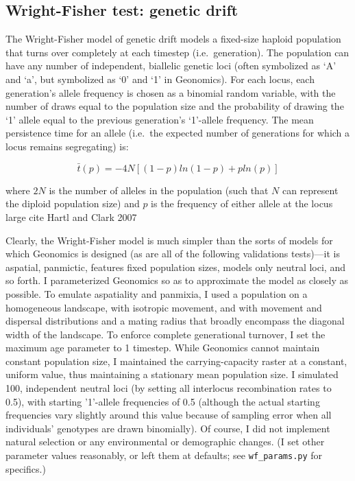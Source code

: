 ﻿\documentclass{article}
\begin{document}
\subsection{Wright-Fisher test: genetic drift}
The Wright-Fisher model of genetic drift models a fixed-size haploid population that
turns over completely at each timestep (i.e.\ generation). The population can have
any number of independent, biallelic genetic loci (often symbolized as ‘A’ and ‘a’,
but symbolized as ‘0’ and ‘1’ in Geonomics). For each locus, each generation’s allele
frequency is chosen as a binomial random variable, with the number of draws equal to
the population size and the probability of drawing the ‘1’ allele equal to the previous 
generation’s ‘1’-allele frequency. The mean persistence time for an allele 
(i.e.\ the expected number of generations for which a locus remains segregating) 
is:

\begin{equation}
\bar{t}(p) = -4N[(1 - p)ln(1 - p) + pln(p)]
\end{equation}

where $2N$ is the number of alleles in the population (such that $N$ can
represent the diploid population size) and $p$ is the frequency of either allele
at the locus {large cite Hartl and Clark 2007}

Clearly, the Wright-Fisher model is much simpler than the sorts of models for which
Geonomics is designed (as are all of the following validations tests)---it is aspatial,
panmictic, features fixed population sizes, models only neutral loci, and so forth. 
I parameterized Geonomics so as to approximate the model as closely as possible.
To emulate aspatiality and panmixia, I used a population on a homogeneous landscape,
with isotropic movement, and with movement and dispersal distributions
and a mating radius that broadly encompass the diagonal width of the landscape.
To enforce complete generational turnover, I set the
maximum age parameter to 1 timestep. While Geonomics cannot maintain constant population
size, I maintained the carrying-capacity raster at a constant, uniform value, thus
maintaining a stationary mean population size. I simulated 100, independent neutral
loci (by setting all interlocus recombination rates to 0.5), with starting '1'-allele
frequencies of 0.5 (although the actual starting frequencies vary slightly around
this value because of sampling error when all individuals' genotypes are drawn binomially).
Of course, I did not implement natural selection or any environmental
or demographic changes.
(I set other parameter values reasonably, or left them at defaults;
see \texttt{wf\_params.py} for specifics.)
\end{document}
